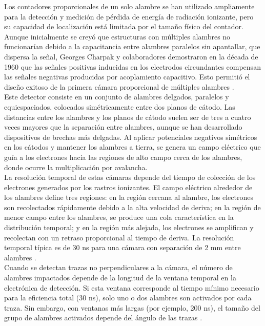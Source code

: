 \documentclass{report}
\begin{document}
\noindent Los contadores proporcionales de un solo alambre se han utilizado ampliamente para la detección y medición de pérdida de energía de radiación ionizante, pero su capacidad de localización está limitada por el tamaño físico del contador. Aunque inicialmente se creyó que estructuras con múltiples alambres no funcionarían debido a la capacitancia entre alambres paralelos sin apantallar, que dispersa la señal, Georges Charpak y colaboradores demostraron en la década de 1960 que las señales positivas inducidas en los electrodos circundantes compensan las señales negativas producidas por acoplamiento capacitivo. Esto permitió el diseño exitoso de la primera cámara proporcional de múltiples alambres \cite{charpak1968use}.\\

\noindent Este detector consiste en un conjunto de alambres delgados, paralelos y equiespaciados, colocados simétricamente entre dos planos de cátodo. Las distancias entre los alambres y los planos de cátodo suelen ser de tres a cuatro veces mayores que la separación entre alambres, aunque se han desarrollado dispositivos de brechas más delgadas. Al aplicar potenciales negativos simétricos en los cátodos y mantener los alambres a tierra, se genera un campo eléctrico que guía a los electrones hacia las regiones de alto campo cerca de los alambres, donde ocurre la multiplicación por avalancha.\\

\noindent La resolución temporal de estas cámaras depende del tiempo de colección de los electrones generados por los rastros ionizantes. El campo eléctrico alrededor de los alambres define tres regiones: en la región cercana al alambre, los electrones son recolectados rápidamente debido a la alta velocidad de deriva; en la región de menor campo entre los alambres, se produce una cola característica en la distribución temporal; y en la región más alejada, los electrones se amplifican y recolectan con un retraso proporcional al tiempo de deriva. La resolución temporal típica es de 30 ns para una cámara con separación de 2 mm entre alambres \cite{sauli1977principles}.\\

\noindent Cuando se detectan trazas no perpendiculares a la cámara, el número de alambres impactados depende de la longitud de la ventana temporal en la electrónica de detección. Si esta ventana corresponde al tiempo mínimo necesario para la eficiencia total (30 ns), solo uno o dos alambres son activados por cada traza. Sin embargo, con ventanas más largas (por ejemplo, 200 ns), el tamaño del grupo de alambres activados depende del ángulo de las trazas \cite{sauli1977principles}.\\
\end{document}
